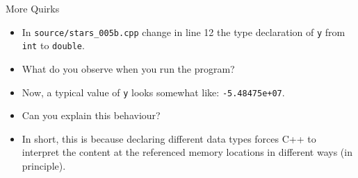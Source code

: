\documentclass[aspectratio=169, 12pt]{beamer}
\begin{document}
	\begin{frame}{More Quirks}
		\begin{itemize}
			\item In \texttt{source/stars\_005b.cpp} change in line 12 the type declaration of \texttt{y} from \texttt{int} to \texttt{double}.
			\item What do you observe when you run the program?
			\item Now, a typical value of \texttt{y} looks somewhat like: \texttt{-5.48475e+07}.
			\item Can you explain this behaviour?\pause
			\item In short, this is because declaring different data types forces C++ to interpret the content at the referenced memory locations in different ways (in principle).
		\end{itemize}
	\end{frame}
\end{document}
